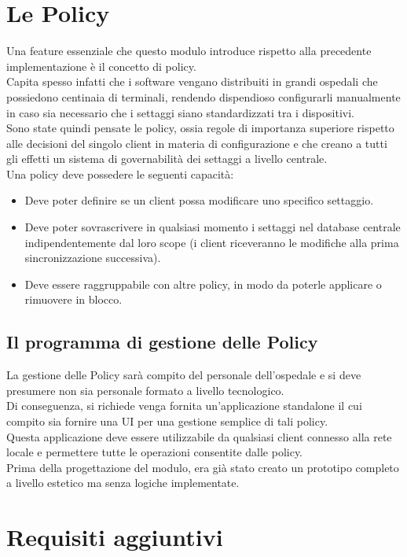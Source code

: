 \documentclass[\main/tesi.tex]{subfiles}
\begin{document}
\section{Le Policy}
Una feature essenziale che questo modulo introduce rispetto alla precedente implementazione è il concetto di policy.\\
Capita spesso infatti che i software vengano distribuiti in grandi ospedali che possiedono centinaia di terminali, rendendo dispendioso configurarli manualmente in caso sia necessario che i settaggi siano standardizzati tra i dispositivi.\\
Sono state quindi pensate le policy, ossia regole di importanza superiore rispetto alle decisioni del singolo client in materia di configurazione e che creano a tutti gli effetti un sistema di governabilità dei settaggi a livello centrale.\\
Una policy deve possedere le seguenti capacità:
\begin{itemize}
    \item Deve poter definire se un client possa modificare uno specifico settaggio.
    \item Deve poter sovrascrivere in qualsiasi momento i settaggi nel database centrale indipendentemente dal loro scope (i client riceveranno le modifiche alla prima sincronizzazione successiva).
    \item Deve essere raggruppabile con altre policy, in modo da poterle applicare o rimuovere in blocco.
\end{itemize}

\subsection{Il programma di gestione delle Policy}
La gestione delle Policy sarà compito del personale dell'ospedale e si deve presumere non sia personale formato a livello tecnologico.\\
Di conseguenza, si richiede venga fornita un'applicazione standalone il cui compito sia fornire una UI per una gestione semplice di tali policy.\\
Questa applicazione deve essere utilizzabile da qualsiasi client connesso alla rete locale e permettere tutte le operazioni consentite dalle policy.\\
Prima della progettazione del modulo, era già stato creato un prototipo completo a livello estetico ma senza logiche implementate.

\section{Requisiti aggiuntivi}
\end{document}
